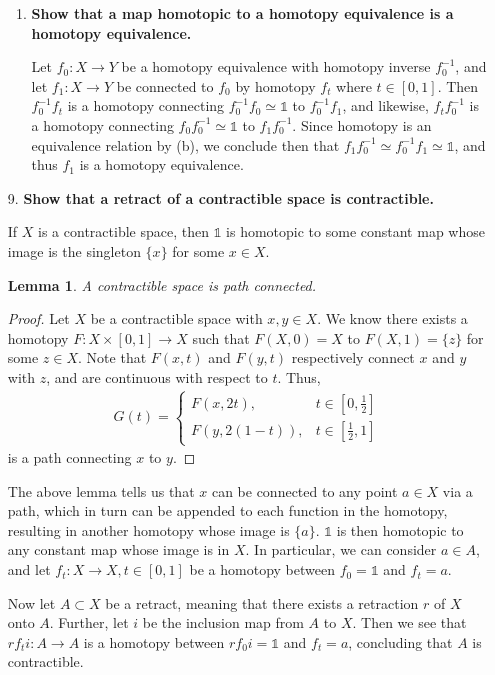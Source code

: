 \documentclass[a4paper,12pt]{article}
\newtheorem{lemma}[theorem]{Lemma}
\begin{document}
\begin{enumerate}
\begin{enumerate}[label=(\alph*)]
            \item
                \boldmath\textbf{Show that a map homotopic to a homotopy equivalence is a homotopy equivalence.
                }\unboldmath \par
                Let $f_0 : X \to Y$ be a homotopy equivalence with homotopy inverse $f_0^{-1}$, and let $f_1 : X \to Y$ be connected to $f_0$ by homotopy $f_t$ where $t \in [0, 1]$. Then $f_0^{-1} f_t$ is a homotopy connecting $f_0^{-1} f_0 \simeq \mathds{1}$ to $f_0^{-1} f_1$, and likewise, $f_t f_0^{-1}$ is a homotopy connecting $f_0 f_0^{-1} \simeq \mathds{1}$ to $f_1 f_0^{-1}$. Since homotopy is an equivalence relation by (b), we conclude then that $f_1 f_0^{-1} \simeq f_0^{-1} f_1 \simeq \mathds{1}$, and thus $f_1$ is a homotopy equivalence.
        \end{enumerate}

    \item[9.]
        \boldmath\textbf{Show that a retract of a contractible space is contractible.
        }\unboldmath \par
        If $X$ is a contractible space, then $\mathds{1}$ is homotopic to some constant map whose image is the singleton $\{x\}$ for some $x \in X$.
        \begin{lemma}
            A contractible space is path connected.
        \end{lemma}
        \begin{proof}
            Let $X$ be a contractible space with $x, y \in X$. We know there exists a homotopy $F : X \times [0, 1] \to X$ such that $F(X, 0) = X$ to $F(X, 1) = \{z\}$ for some $z \in X$. Note that $F(x, t)$ and $F(y, t)$ respectively connect $x$ and $y$ with $z$, and are continuous with respect to $t$. Thus,
            \begin{align*}
                G(t) = \begin{cases}
                    F(x, 2t), &t \in [0, \frac{1}{2}] \\
                    F(y, 2(1 - t)),  &t \in [\frac{1}{2}, 1]
                \end{cases}
            \end{align*}
            is a path connecting $x$ to $y$.
        \end{proof}
        The above lemma tells us that $x$ can be connected to any point $a \in X$ via a path, which in turn can be appended to each function in the homotopy, resulting in another homotopy whose image is $\{a\}$. $\mathds{1}$ is then homotopic to any constant map whose image is in $X$. In particular, we can consider $a \in A$, and let $f_t : X \to X, t \in [0, 1]$ be a homotopy between $f_0 = \mathds{1}$ and $f_t = a$. \par
        Now let $A \subset X$ be a retract, meaning that there exists a retraction $r$ of $X$ onto $A$. Further, let $i$ be the inclusion map from $A$ to $X$. Then we see that $r f_t i : A \to A$ is a homotopy between $r f_0 i = \mathds{1}$ and $f_t = a$, concluding that $A$ is contractible.


\end{enumerate}
\end{document}

